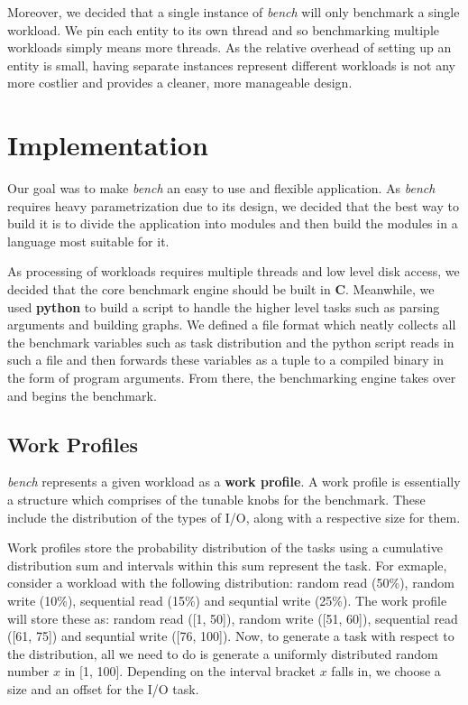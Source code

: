 \documentclass[10pt, author, twocolumn]{article}
\begin{document}
Moreover, we decided that a single instance of \textit{bench} will only benchmark a single workload. We pin each entity to its own thread and so benchmarking multiple workloads simply means more threads. As the relative overhead of setting up an entity is small, having separate instances represent different workloads is not any more costlier and provides a cleaner, more manageable design. 

\section{Implementation}
Our goal was to make \textit{bench} an easy to use and flexible application. As \textit{bench} requires heavy parametrization due to its design, we decided that the best way to build it is to divide the application into modules and then build the modules in a language most suitable for it.

As processing of workloads requires multiple threads and low level disk access, we decided that the core benchmark engine should be built in \textbf{C}. Meanwhile, we used \textbf{python} to build a script to handle the higher level tasks such as parsing arguments and building graphs. We defined a file format which neatly collects all the benchmark variables such as task distribution and the python script reads in such a file and then forwards these variables as a tuple to a compiled binary in the form of program arguments. From there, the benchmarking engine takes over and begins the benchmark. 

\subsection{Work Profiles}
\textit{bench} represents a given workload as a \textbf{work profile}. A work profile is essentially a structure which comprises of the tunable knobs for the benchmark. These include the distribution of the types of I/O, along with a respective size for them. 

Work profiles store the probability distribution of the tasks using a cumulative distribution sum and intervals within this sum represent the task. For exmaple, consider a workload with the following distribution: random read (50\%), random write (10\%), sequential read (15\%) and sequntial write (25\%). The work profile will store these as: random read ([1, 50]), random write ([51, 60]), sequential read ([61, 75]) and sequntial write ([76, 100]). Now, to generate a task with respect to the distribution, all we need to do is generate a uniformly distributed random number $x$ in [1, 100]. Depending on the interval bracket $x$ falls in, we choose a size and an offset for the I/O task. 
\end{document}
